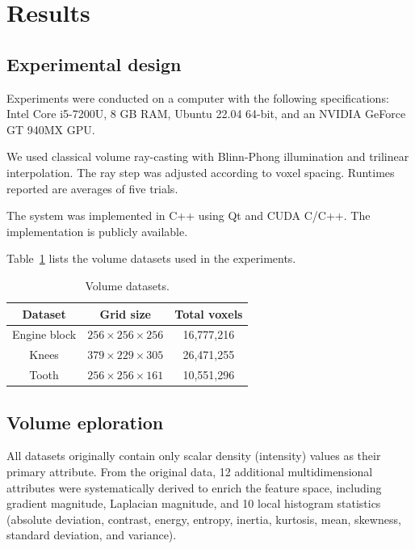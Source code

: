 \section{Results}
\label{sect:results}

\subsection{Experimental design}
\label{subsect:experimental-design}

Experiments were conducted on a computer with the following specifications: Intel Core i5-7200U, 8 GB RAM, Ubuntu 22.04 64-bit, and an NVIDIA GeForce GT 940MX GPU.

We used classical volume ray-casting with Blinn-Phong illumination and trilinear interpolation. The ray step was adjusted according to voxel spacing. Runtimes reported are averages of five trials.

The system was implemented in C++ using Qt and CUDA C/C++. The implementation is publicly available.

Table~\ref{tab:datasets-descriptions} lists the volume datasets used in the experiments.

\begin{table}[htb!]
    \centering
    \caption{Volume datasets.}
    \begin{tabular}{@{}ccc@{}}
        \toprule
        \textbf{Dataset} & \textbf{Grid size} & \textbf{Total voxels} \\ 
        \midrule
        Engine block & $256 \times 256 \times 256$ & 16,777,216\\
        Knees & $379 \times 229 \times 305$ & 26,471,255\\
        Tooth & $256 \times 256 \times 161$ & 10,551,296\\
        \bottomrule
    \end{tabular}
    \label{tab:datasets-descriptions}
\end{table}


\subsection{Volume eploration}
\label{subsect:volume-exploration}

All datasets originally contain only scalar density (intensity) values as their primary attribute. From the original data, 12 additional multidimensional attributes were systematically derived to enrich the feature space, including gradient magnitude, Laplacian magnitude, and 10 local histogram statistics (absolute deviation, contrast, energy, entropy, inertia, kurtosis, mean, skewness, standard deviation, and variance).

